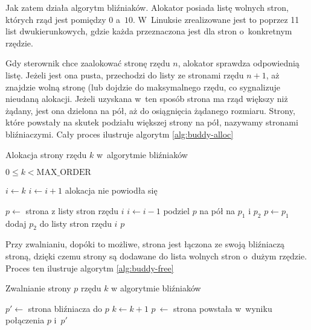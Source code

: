 Jak zatem działa algorytm bliźniaków.  Alokator posiada listę wolnych
stron, których rząd jest pomiędzy $0$ a~$10$.  W~Linuksie zrealizowane
jest to poprzez 11 list dwukierunkowych, gdzie każda przeznaczona jest
dla stron o~konkretnym rzędzie.

Gdy sterownik chce zaalokować stronę rzędu $n$, alokator sprawdza
odpowiednią listę.  Jeżeli jest ona pusta, przechodzi do listy ze
stronami rzędu $n+1$, aż znajdzie wolną stronę (lub dojdzie do
maksymalnego rzędu, co sygnalizuje nieudaną alokacji.  Jeżeli uzyskana
w~ten sposób strona ma rząd większy niż żądany, jest ona dzielona na
pół, aż do osiągnięcia żądanego rozmiaru.  Strony, które powstały na
skutek podziału większej strony na pół, nazywamy stronami
bliźniaczymi.  Cały proces ilustruje algorytm \ref{alg:buddy-alloc}

\begin{algorithm}
\caption{Alokacja strony rzędu $k$ w~algorytmie bliźniaków}
\label{alg:buddy-alloc}
\begin{algorithmic}[1]
\REQUIRE $0 \leq k < \mathrm{MAX\_ORDER}$

\STATE $i \gets k$
    \STATE $i \gets i + 1$
        \RETURN alokacja nie powiodła się
    \ENDIF
\ENDWHILE

\STATE $p \gets$ strona z listy stron rzędu $i$
    \STATE $i \gets i - 1$
    \STATE podziel $p$ na pół na $p_1$ i $p_2$
    \STATE $p \gets p_1$
    \STATE dodaj $p_2$ do listy stron rzędu $i$
\ENDWHILE
\RETURN $p$
\end{algorithmic}
\end{algorithm}

Przy zwalnianiu, dopóki to możliwe, strona jest łączona ze swoją
bliźniaczą stroną, dzięki czemu strony są dodawane do lista wolnych
stron o~dużym rzędzie.  Proces ten ilustruje algorytm
\ref{alg:buddy-free}

\begin{algorithm}
\caption{Zwalnianie strony $p$ rzędu $k$ w algorytmie bliźniaków}
\label{alg:buddy-free}
\begin{algorithmic}[1]
    \STATE $p' \gets$ strona bliźniacza do $p$
        \STATE $k \gets k + 1$
        \STATE $p~\gets$ strona powstała w~wyniku połączenia $p$ i~$p'$
    \ELSE
    \ENDIF
\ENDWHILE
\end{algorithmic}
\end{algorithm}



